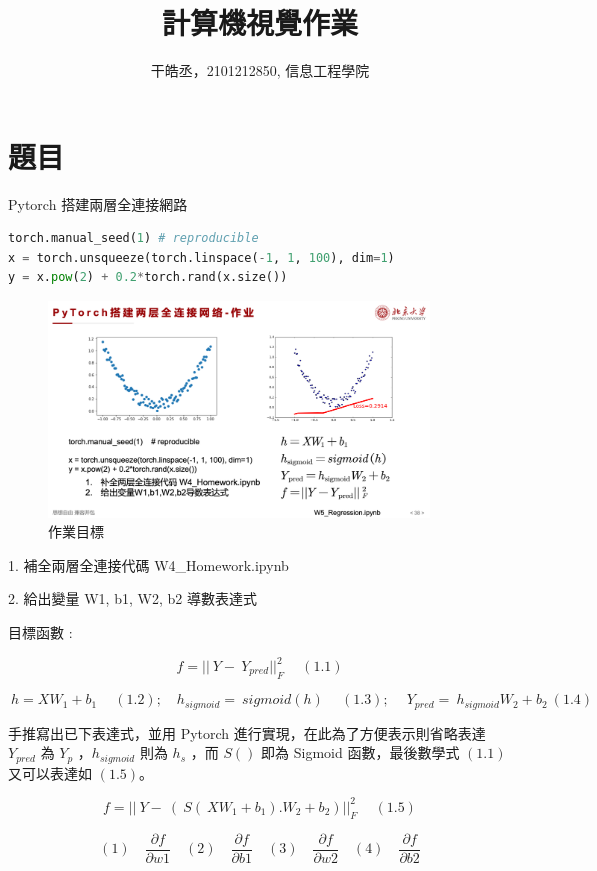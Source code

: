 \documentclass[11pt,UTF8]{ctexart}
\title{計算機視覺作業}
\author{干皓丞，2101212850, 信息工程學院}
\begin{document}
\maketitle


\section{題目}

Pytorch 搭建兩層全連接網路

	\begin{lstlisting}[language={python}]
torch.manual_seed(1) # reproducible
x = torch.unsqueeze(torch.linspace(-1, 1, 100), dim=1) 
y = x.pow(2) + 0.2*torch.rand(x.size())
	\end{lstlisting}

\begin{figure}[H]
\centering 
\includegraphics[width=0.9\textwidth]{t1.png} 
\caption{作業目標}
\label{Test}
\end{figure}

1. 補全兩層全連接代碼 W4\_Homework.ipynb

2. 給出變量 W1, b1, W2, b2 導數表達式

目標函數 :

$$f={||\ Y - \ Y_{pred}||}_F^2 \quad \ (1.1)$$

$$ \ h = XW_{1} + b_{1}  \quad \ (1.2);\quad h_{sigmoid} = \ sigmoid(h) \quad \ (1.3);\quad \ Y_{pred} = \ h_{sigmoid}W_{2} + b_{2}  \ (1.4)$$

手推寫出已下表達式，並用 Pytorch 進行實現，在此為了方便表示則省略表達 $Y_{pred}$ 為 $Y_{p}$ ，$h_{sigmoid}$ 則為 $h_{s}$ ，而 $S()$ 即為 Sigmoid 函數，最後數學式 $(1.1)$ 又可以表達如 $(1.5)$。

$$f={||\ Y - \ ( \ S( \ XW_{1} + b_{1}).W_{2} + b_{2} )||}_F^2 \quad \ (1.5)$$

$$ (1)\quad \frac{\partial f}{\partial w1}  \quad (2)\quad \frac{\partial f}{\partial b1} \quad (3)\quad \frac{\partial f}{\partial w2} \quad (4)\quad \frac{\partial f}{\partial b2}$$
\end{document}
